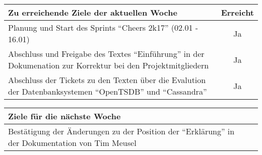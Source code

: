 \begin{tabularx}{\textwidth}{Xc}
    \arrayrulecolor{OliveGreen}
    \toprule
    {\bfseries Zu erreichende Ziele der aktuellen Woche} & {\bfseries Erreicht} \\
    \midrule[2pt]
    Planung und Start des Sprints ``Cheers 2k17'' (02.01 - 16.01)  &  Ja  \\
    \rowcolor{OliveGreen!15}
    Abschluss und Freigabe des Textes ``Einführung'' in der
    Dokumenation zur Korrektur bei den Projektmitgliedern  &  Ja  \\
    \rowcolor{White}
    Abschluss der Tickets zu den Texten über die Evalution der
    Datenbanksystemen ``OpenTSDB'' und ``Cassandra''  &  Ja  \\
    \bottomrule[2pt]
\end{tabularx}
%
\vspace{1cm}
%
\begin{tabularx}{\textwidth}{Xc}
    \arrayrulecolor{OliveGreen}
    \toprule
    {\bfseries Ziele für die nächste Woche}              &                      \\
    \midrule[2pt]
    Bestätigung der Änderungen zu der Position der ``Erklärung'' in der
    Dokumentation von Tim Meusel  &  \\
\end{tabularx}
